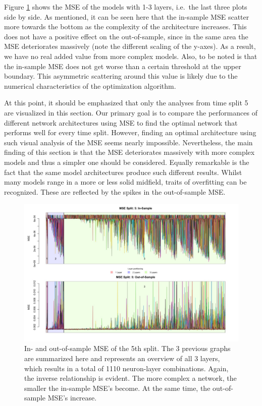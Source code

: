 \documentclass[
]{article}
\begin{document}
Figure \ref{fig:mse_plot5} shows the MSE of the models with 1-3 layers,
i.e.~the last three plots side by side. As mentioned, it can be seen
here that the in-sample MSE scatter more towards the bottom as the
complexity of the architecture increases. This does not have a positive
effect on the out-of-sample, since in the same area the MSE deteriorates
massively (note the different scaling of the y-axes). As a result, we
have no real added value from more complex models. Also, to be noted is
that the in-sample MSE does not get worse than a certain threshold at
the upper boundary. This asymmetric scattering around this value is
likely due to the numerical characteristics of the optimization
algorithm.

At this point, it should be emphasized that only the analyses from time
split 5 are visualized in this section. Our primary goal is to compare
the performances of different network architectures using MSE to find
the optimal network that performs well for every time split. However,
finding an optimal architecture using such visual analysis of the MSE
seems nearly impossible. Nevertheless, the main finding of this section
is that the MSE deteriorates massively with more complex models and thus
a simpler one should be considered. Equally remarkable is the fact that
the same model architectures produce such different results. Whilst many
models range in a more or less solid midfield, traits of overfitting can
be recognized. These are reflected by the spikes in the out-of-sample
MSE.

\begin{figure}

{\centering \includegraphics[width=1\linewidth]{images/batch5/mse_5_all} 

}

\caption{In- and out-of-sample MSE of the 5th split. The 3 previous graphs are summarized here and represents an overview of all 3 layers, which results in a total of 1110 neuron-layer combinations. Again, the inverse relationship is evident. The more complex a network, the smaller the in-sample MSE's become. At the same time, the out-of-sample MSE's increase.}\label{fig:mse_plot5}
\end{figure}
\end{document}
